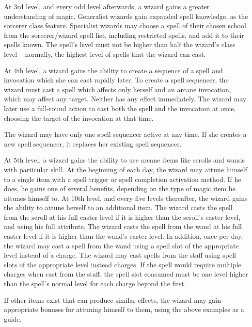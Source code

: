  At 3rd level, and every odd level afterwards, a wizard gains a greater understanding of magic. Generalist wizards gain expanded spell knowledge, as the sorcerer class feature. Specialist wizards may choose a spell of their chosen school from the sorcerer/wizard spell list, including restricted spells, and add it to their spells known. The spell's level must not be higher than half the wizard's class level -- normally, the highest level of spells that the wizard can cast.

 At 4th level, a wizard gains the ability to create a sequence of a spell and invocation which she can cast rapidly later. To create a spell sequencer, the wizard must cast a spell which affects only herself and an arcane invocation, which may affect any target. Neither has any effect immediately. The wizard may later use a full-round action to cast both the spell and the invocation at once, choosing the target of the invocation at that time.
\par The wizard may have only one spell sequencer active at any time. If she creates a new spell sequencer, it replaces her existing spell sequencer.

 At 5th level, a wizard gains the ability to use arcane items like scrolls and wands with particular skill. At the beginning of each day, the wizard may attune himself to a single item with a spell trigger or spell completion activation method. If he does, he gains one of several benefits, depending on the type of magic item he attunes himself to. At 10th level, and every five levels thereafter, the wizard gains the ability to attune herself to an additional item.
 The wizard casts the spell from the scroll at his full caster level if it is higher than the scroll's caster level, and using his full attribute.
 The wizard casts the spell from the wand at his full caster level if it is higher than the wand's caster level. In addition, once per day, the wizard may cast a spell from the wand using a spell slot of the appropriate level instead of a charge.
 The wizard may cast spells from the staff using spell slots of the appropriate level instead charges. If the spell would require multiple charges when cast from the staff, the spell slot consumed must be one level higher than the spell's normal level for each charge beyond the first.
\par If other items exist that can produce similar effects, the wizard may gain appropriate bonuses for attuning himself to them, using the above examples as a guide.

